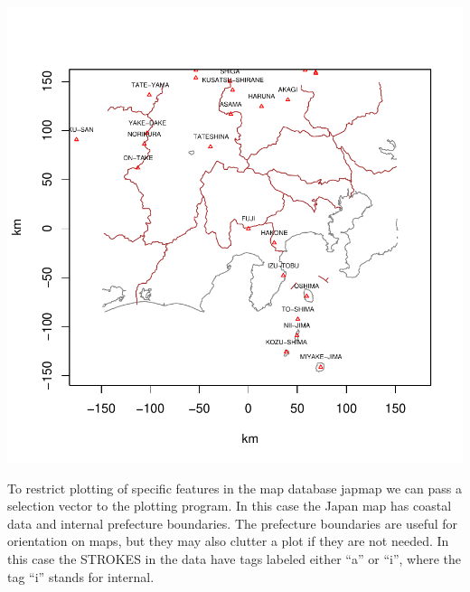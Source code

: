 \documentclass{article}
\begin{document}
\begin{Schunk}
\end{Schunk}
\includegraphics{gmap-012}


To restrict plotting of specific 
features in the map database japmap we can 
pass a selection vector to the 
plotting program.  In this case the Japan 
map has coastal data and internal prefecture boundaries.
The prefecture boundaries are useful for
orientation on maps, but they may also clutter a
plot if they are not needed.
In this case the STROKES in the data 
have tags labeled either ``a'' or ``i'', where the tag
``i'' stands for internal.
\end{document}
